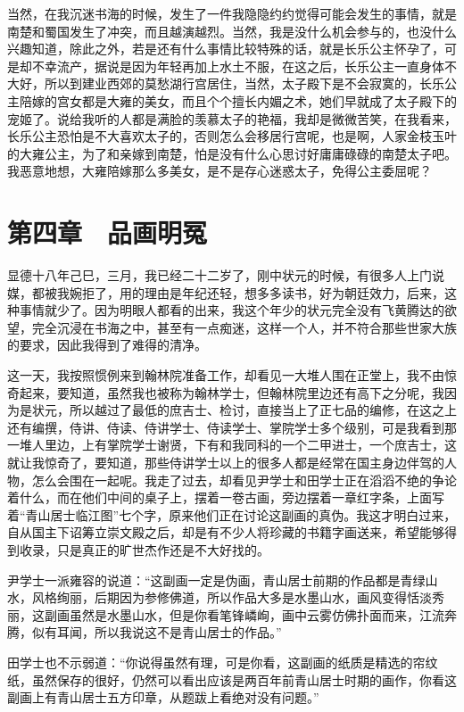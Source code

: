 当然，在我沉迷书海的时候，发生了一件我隐隐约约觉得可能会发生的事情，就是南楚和蜀国发生了冲突，而且越演越烈。当然，我是没什么机会参与的，也没什么兴趣知道，除此之外，若是还有什么事情比较特殊的话，就是长乐公主怀孕了，可是却不幸流产，据说是因为年轻再加上水土不服，在这之后，长乐公主一直身体不大好，所以到建业西郊的莫愁湖行宫居住，当然，太子殿下是不会寂寞的，长乐公主陪嫁的宫女都是大雍的美女，而且个个擅长内媚之术，她们早就成了太子殿下的宠姬了。说给我听的人都是满脸的羡慕太子的艳福，我却是微微苦笑，在我看来，长乐公主恐怕是不大喜欢太子的，否则怎么会移居行宫呢，也是啊，人家金枝玉叶的大雍公主，为了和亲嫁到南楚，怕是没有什么心思讨好庸庸碌碌的南楚太子吧。我恶意地想，大雍陪嫁那么多美女，是不是存心迷惑太子，免得公主委屈呢？

\chapter{第四章　品画明冤}

显德十八年己巳，三月，我已经二十二岁了，刚中状元的时候，有很多人上门说媒，都被我婉拒了，用的理由是年纪还轻，想多多读书，好为朝廷效力，后来，这种事情就少了。因为明眼人都看的出来，我这个年少的状元完全没有飞黄腾达的欲望，完全沉浸在书海之中，甚至有一点痴迷，这样一个人，并不符合那些世家大族的要求，因此我得到了难得的清净。

这一天，我按照惯例来到翰林院准备工作，却看见一大堆人围在正堂上，我不由惊奇起来，要知道，虽然我也被称为翰林学士，但翰林院里边还有高下之分呢，我因为是状元，所以越过了最低的庶吉士、检讨，直接当上了正七品的编修，在这之上还有编撰，侍讲、侍读、侍讲学士、侍读学士、掌院学士多个级别，可是我看到那一堆人里边，上有掌院学士谢贤，下有和我同科的一个二甲进士，一个庶吉士，这就让我惊奇了，要知道，那些侍讲学士以上的很多人都是经常在国主身边伴驾的人物，怎么会围在一起呢。我走了过去，却看见尹学士和田学士正在滔滔不绝的争论着什么，而在他们中间的桌子上，摆着一卷古画，旁边摆着一章红字条，上面写着“青山居士临江图”七个字，原来他们正在讨论这副画的真伪。我这才明白过来，自从国主下诏筹立崇文殿之后，却是有不少人将珍藏的书籍字画送来，希望能够得到收录，只是真正的旷世杰作还是不大好找的。

尹学士一派雍容的说道：“这副画一定是伪画，青山居士前期的作品都是青绿山水，风格绚丽，后期因为参修佛道，所以作品大多是水墨山水，画风变得恬淡秀丽，这副画虽然是水墨山水，但是你看笔锋嶙峋，画中云雾仿佛扑面而来，江流奔腾，似有耳闻，所以我说这不是青山居士的作品。”

田学士也不示弱道：“你说得虽然有理，可是你看，这副画的纸质是精选的帘纹纸，虽然保存的很好，仍然可以看出应该是两百年前青山居士时期的画作，你看这副画上有青山居士五方印章，从题跋上看绝对没有问题。”

